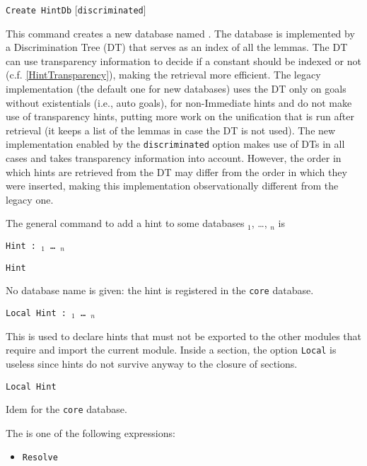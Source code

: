 \begin{coq_example*}
\medskip
\texttt{Create HintDb} {\ident} [\texttt{discriminated}]
\medskip

This command creates a new database named \ident.
The database is implemented by a Discrimination Tree (DT) that serves as
an index of all the lemmas. The DT can use transparency information to decide
if a constant should be indexed or not (c.f. \ref{HintTransparency}),
making the retrieval more efficient.
The legacy implementation (the default one for new databases) uses the
DT only on goals without existentials (i.e., auto goals), for non-Immediate
hints and do not make use of transparency hints, putting more work on the
unification that is run after retrieval (it keeps a list of the lemmas
in case the DT is not used). The new implementation enabled by
the {\tt discriminated} option makes use of DTs in all cases and takes
transparency information into account. However, the order in which hints
are retrieved from the DT may differ from the order in which they were
inserted, making this implementation observationally different from the
legacy one.

The general
command to add a hint to some databases \ident$_1$, \dots, \ident$_n$ is
\begin{tabbing}
  {\tt Hint {\hintdef} :~\ident$_1$ \mbox{\dots} \ident$_n$}
\end{tabbing}

\begin{Variants}
\item {\tt Hint \hintdef}

  No database name is given: the hint is registered in the {\tt core}
    database.

\item {\tt Local Hint {\hintdef} :~\ident$_1$ \mbox{\dots} \ident$_n$}

  This is used to declare hints that must not be exported to the other
  modules that require and import the current module. Inside a
  section, the option {\tt Local} is useless since hints do not
  survive anyway to the closure of sections.

\item {\tt Local Hint \hintdef}

  Idem for the {\tt core} database.

\end{Variants}

The {\hintdef} is one of the following expressions:

\begin{itemize}
\item {\tt Resolve \term}


\end{itemize}
\end{coq_example*}
